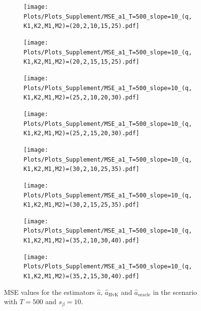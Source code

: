 \begin{figure}[p]
\begin{subfigure}[b]{0.45\textwidth}
\texttt{[image: Plots/Plots\_Supplement/MSE\_a1\_T=500\_slope=10\_(q,K1,K2,M1,M2)=(20,2,10,15,25).pdf]}
\end{subfigure}
\hspace{0.25cm}
\begin{subfigure}[b]{0.45\textwidth}
\texttt{[image: Plots/Plots\_Supplement/MSE\_a1\_T=500\_slope=10\_(q,K1,K2,M1,M2)=(20,2,15,15,25).pdf]}
\end{subfigure}

\begin{subfigure}[b]{0.45\textwidth}
\texttt{[image: Plots/Plots\_Supplement/MSE\_a1\_T=500\_slope=10\_(q,K1,K2,M1,M2)=(25,2,10,20,30).pdf]}
\end{subfigure}
\hspace{0.25cm}
\begin{subfigure}[b]{0.45\textwidth}
\texttt{[image: Plots/Plots\_Supplement/MSE\_a1\_T=500\_slope=10\_(q,K1,K2,M1,M2)=(25,2,15,20,30).pdf]}
\end{subfigure}

\begin{subfigure}[b]{0.45\textwidth}
\texttt{[image: Plots/Plots\_Supplement/MSE\_a1\_T=500\_slope=10\_(q,K1,K2,M1,M2)=(30,2,10,25,35).pdf]}
\end{subfigure}
\hspace{0.25cm}
\begin{subfigure}[b]{0.45\textwidth}
\texttt{[image: Plots/Plots\_Supplement/MSE\_a1\_T=500\_slope=10\_(q,K1,K2,M1,M2)=(30,2,15,25,35).pdf]}
\end{subfigure}

\begin{subfigure}[b]{0.45\textwidth}
\texttt{[image: Plots/Plots\_Supplement/MSE\_a1\_T=500\_slope=10\_(q,K1,K2,M1,M2)=(35,2,10,30,40).pdf]}
\end{subfigure}
\hspace{0.25cm}
\begin{subfigure}[b]{0.45\textwidth}
\texttt{[image: Plots/Plots\_Supplement/MSE\_a1\_T=500\_slope=10\_(q,K1,K2,M1,M2)=(35,2,15,30,40).pdf]}
\end{subfigure}
\caption{MSE values for the estimators $\widehat{a}$, $\widehat{a}_{\text{HvK}}$ and $\widehat{a}_{\text{oracle}}$ in the scenario with $T=500$ and $s_\beta=10$.}\label{fig:MSE_slope10_AR_robust} 
\end{figure}


